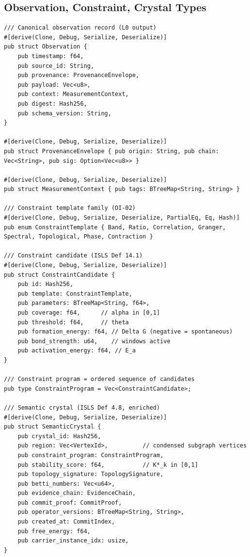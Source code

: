 \documentclass[10pt,a4paper]{article}
\theoremstyle{definition}\newtheorem{definition}{Def}[section]
\theoremstyle{plain}\newtheorem{theorem}{Thm}[section]
\begin{document}
\subsection{Observation, Constraint, Crystal Types}

\begin{lstlisting}[style=rust]
/// Canonical observation record (L0 output)
#[derive(Clone, Debug, Serialize, Deserialize)]
pub struct Observation {
    pub timestamp: f64,
    pub source_id: String,
    pub provenance: ProvenanceEnvelope,
    pub payload: Vec<u8>,
    pub context: MeasurementContext,
    pub digest: Hash256,
    pub schema_version: String,
}

#[derive(Clone, Debug, Serialize, Deserialize)]
pub struct ProvenanceEnvelope { pub origin: String, pub chain: Vec<String>, pub sig: Option<Vec<u8>> }

#[derive(Clone, Debug, Serialize, Deserialize)]
pub struct MeasurementContext { pub tags: BTreeMap<String, String> }

/// Constraint template family (OI-02)
#[derive(Clone, Debug, Serialize, Deserialize, PartialEq, Eq, Hash)]
pub enum ConstraintTemplate { Band, Ratio, Correlation, Granger, Spectral, Topological, Phase, Contraction }

/// Constraint candidate (ISLS Def 14.1)
#[derive(Clone, Debug, Serialize, Deserialize)]
pub struct ConstraintCandidate {
    pub id: Hash256,
    pub template: ConstraintTemplate,
    pub parameters: BTreeMap<String, f64>,
    pub coverage: f64,      // alpha in [0,1]
    pub threshold: f64,     // theta
    pub formation_energy: f64, // Delta G (negative = spontaneous)
    pub bond_strength: u64,    // windows active
    pub activation_energy: f64, // E_a
}

/// Constraint program = ordered sequence of candidates
pub type ConstraintProgram = Vec<ConstraintCandidate>;

/// Semantic crystal (ISLS Def 4.8, enriched)
#[derive(Clone, Debug, Serialize, Deserialize)]
pub struct SemanticCrystal {
    pub crystal_id: Hash256,
    pub region: Vec<VertexId>,          // condensed subgraph vertices
    pub constraint_program: ConstraintProgram,
    pub stability_score: f64,           // K*_k in [0,1]
    pub topology_signature: TopologySignature,
    pub betti_numbers: Vec<u64>,
    pub evidence_chain: EvidenceChain,
    pub commit_proof: CommitProof,
    pub operator_versions: BTreeMap<String, String>,
    pub created_at: CommitIndex,
    pub free_energy: f64,
    pub carrier_instance_idx: usize,
}
\end{lstlisting}
\end{document}
